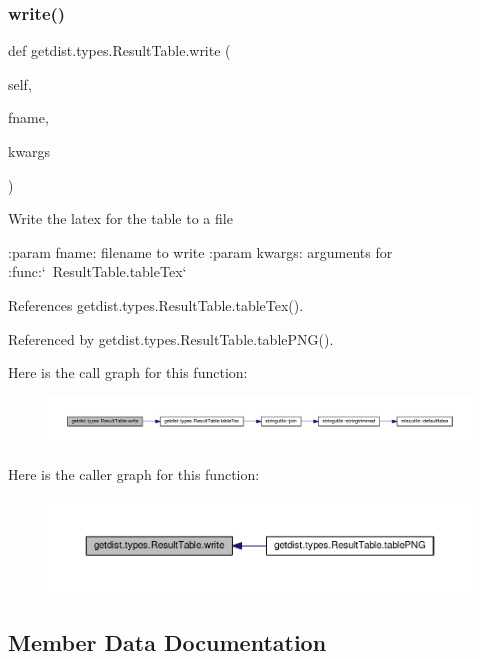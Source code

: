 \subsubsection{\texorpdfstring{write()}{write()}}
{\footnotesize\ttfamily def getdist.\+types.\+Result\+Table.\+write (\begin{DoxyParamCaption}\item[{}]{self,  }\item[{}]{fname,  }\item[{}]{kwargs }\end{DoxyParamCaption})}

\begin{DoxyVerb}Write the latex for the table to a file

:param fname: filename to write
:param kwargs: arguments for :func:`~ResultTable.tableTex`
\end{DoxyVerb}
 

References getdist.\+types.\+Result\+Table.\+table\+Tex().



Referenced by getdist.\+types.\+Result\+Table.\+table\+P\+N\+G().

Here is the call graph for this function\+:
\nopagebreak
\begin{figure}[H]
\begin{center}
\leavevmode
\includegraphics[width=350pt]{classgetdist_1_1types_1_1ResultTable_a76ef92c87d609551019760f157829f2c_cgraph}
\end{center}
\end{figure}
Here is the caller graph for this function\+:
\nopagebreak
\begin{figure}[H]
\begin{center}
\leavevmode
\includegraphics[width=350pt]{classgetdist_1_1types_1_1ResultTable_a76ef92c87d609551019760f157829f2c_icgraph}
\end{center}
\end{figure}


\subsection{Member Data Documentation}
\mbox{\label{classgetdist_1_1types_1_1ResultTable_a602bb3d574d9ab74b170d9dcad1662e6}} 
